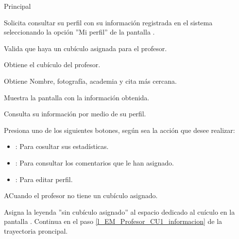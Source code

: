 \begin{UCtrayectoria}{Principal}
	
	\UCpaso [\UCactor] Solicita consultar su perfil con su información registrada en el sistema seleccionando la opción ''Mi perfil'' de la pantalla .

	\UCpaso Valida que haya un cubículo asignada para el profesor.

	\UCpaso Obtiene el cubículo del profesor.  

	\UCpaso Obtiene Nombre, fotografía, academia y cita más cercana. \label{l_EM_Profesor_CU1_informacion}

	\UCpaso Muestra la pantalla  con la información obtenida.

	\UCpaso[\UCactor] Consulta su información por medio de su perfil.

	\UCpaso [\UCactor] Presiona uno de los siguientes botones, según sea la acción que desee realizar: 
	\begin{itemize}
		\item {}: Para cosultar sus estadísticas.
		\item {}: Para consultar los comentarios que le han asignado.
		\item {}: Para editar perfil.  
	\end{itemize}

\end{UCtrayectoria}

\begin{UCtrayectoriaA}{A}{Cuando el profesor no tiene un cubículo asignado.}

	\UCpaso	Asigna la leyenda ''sin cubículo asignado'' al espacio dedicado al cuículo en la pantalla .
	\UCpaso Continua en el paso \ref{l_EM_Profesor_CU1_informacion} de la trayectoria proncipal.

\end{UCtrayectoriaA}
